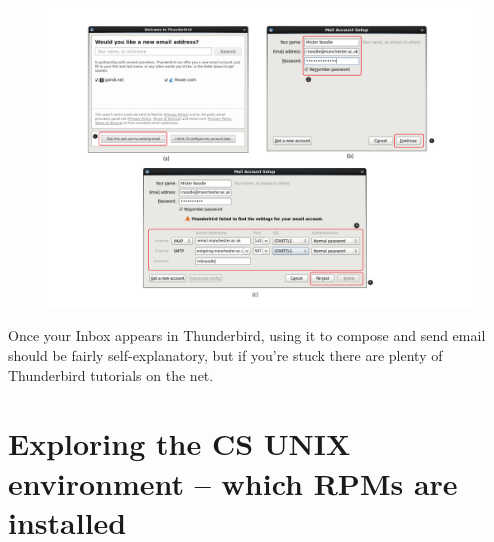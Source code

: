 \begin{figure}[h]
\centerline{\includegraphics[width=17cm]{images/thunderbird-instructions}}
\caption{}\label{figure:thunderbird}
\end{figure}

Once your Inbox appears in Thunderbird, using it to compose and send email should be fairly self-explanatory, but if you're stuck there are plenty of Thunderbird tutorials on the net. 


\section{Exploring the CS UNIX environment -- which RPMs are installed}



